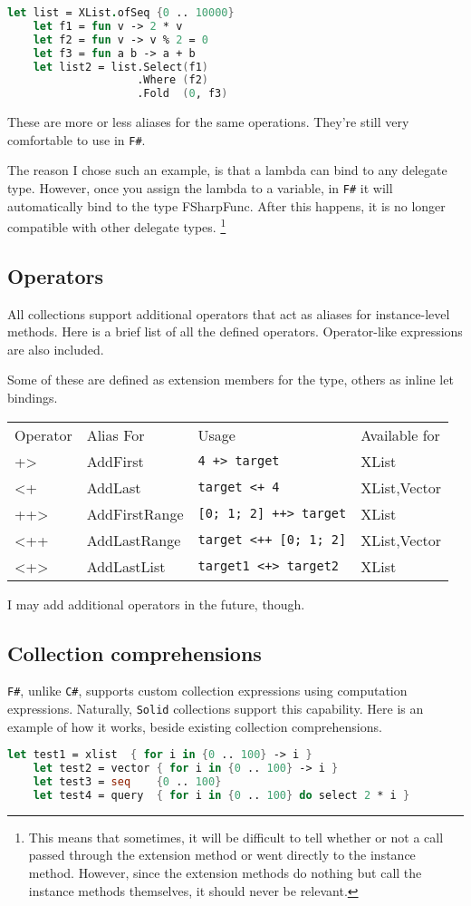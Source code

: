 \documentclass[]{article}
\newcommand{\codeformat}{\ttfamily}
\newcommand{\classformat}{\codeformat\color{olive}}
\newcommand{\operatorformat}{\codeformat\color{red}}
\newcommand{\oper}[1]{{\operatorformat #1}}
\newcommand{\class}[1]{{\classformat #1}}
\newcommand{\code}[1]{\texttt{#1}}
\newcommand{\solid}{\texttt{Solid}\xspace}
\newcommand{\fsh}{\texttt{F\#}\xspace}
\newcommand{\csh}{\texttt{C\#}\xspace}
\begin{document}
\begin{lstlisting}[language=fsharp]
	let list = XList.ofSeq {0 .. 10000}
	let f1 = fun v -> 2 * v
	let f2 = fun v -> v % 2 = 0
	let f3 = fun a b -> a + b
	let list2 = list.Select(f1)
					.Where (f2)
					.Fold  (0, f3)
\end{lstlisting}
These are more or less aliases for the same operations. They're still very comfortable to use in \fsh.

The reason I chose such an example, is that a lambda can bind to any delegate type. However, once you assign the lambda to a variable, in \fsh it will automatically bind to the type \class{FSharpFunc}. After this happens, it is no longer compatible with other delegate types. \footnote{This means that sometimes, it will be difficult to tell whether or not a call passed through the extension method or went directly to the instance method. However, since the extension methods do nothing but call the instance methods themselves, it should never be relevant.}
\subsection{Operators}\label{sec:fsh-operators}
All collections support additional operators that act as aliases for instance-level methods. Here is a brief list of all the defined operators. Operator-like expressions are also included.

Some of these are defined as extension members for the type, others as inline let bindings.
\begin{center}
\ttfamily
\begin{tabu}{llll}
Operator & Alias For & Usage & Available for \\
\oper{+>} & AddFirst & \code{4 +> target} & XList\\
\oper{<+} & AddLast & \code{target <+ 4} & XList,Vector\\
\oper{++>} & AddFirstRange & \code{[0; 1; 2] ++> target} & XList\\
\oper{<++} & AddLastRange & \code{target <++ [0; 1; 2]} & XList,Vector\\
\oper{<+>} & AddLastList & \code{target1 <+> target2} & XList \\
\end{tabu}
\end{center}

I may add additional operators in the future, though.

\subsection{Collection comprehensions}
\fsh, unlike \csh, supports custom collection expressions using computation expressions. Naturally, \solid collections support this capability. Here is an example of how it works, beside existing collection comprehensions.
\begin{lstlisting}[language=fsharp]
	let test1 = xlist  { for i in {0 .. 100} -> i }
	let test2 = vector { for i in {0 .. 100} -> i }
	let test3 = seq    {0 .. 100}
	let test4 = query  { for i in {0 .. 100} do select 2 * i }
\end{lstlisting} 
\end{document}
